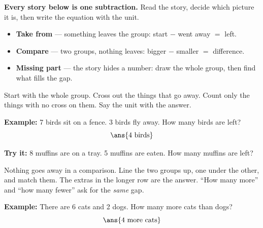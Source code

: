 \documentclass[12pt]{article}
\begin{document}

\begin{formulabox}
\textbf{Every story below is one subtraction.} Read the story, decide which
picture it is, then write the equation with the unit.
\begin{itemize}[leftmargin=0.9cm, itemsep=1pt, topsep=1pt]
\item \textbf{Take from} --- something leaves the group:
      start $-$ went away $=$ left.
\item \textbf{Compare} --- two groups, nothing leaves:
      bigger $-$ smaller $=$ difference.
\item \textbf{Missing part} --- the story hides a number:
      draw the whole group, then find what fills the gap.
\end{itemize}
\end{formulabox}


\begin{formulabox}
Start with the whole group. Cross out the things that go away. Count only the
things with no cross on them. Say the unit with the answer.
\end{formulabox}

\begin{examplebox}
\textbf{Example:} 7 birds sit on a fence. 3 birds fly away. How many birds are
left?
\[ \ans{4 \text{ birds}} \]
\end{examplebox}

\begin{tryitbox}
\textbf{Try it:} 8 muffins are on a tray. 5 muffins are eaten. How many muffins
are left?

\end{tryitbox}


\begin{formulabox}
Nothing goes away in a comparison. Line the two groups up, one under the other,
and match them. The extras in the longer row are the answer. ``How many more''
and ``how many fewer'' ask for the \emph{same} gap.
\end{formulabox}

\begin{examplebox}
\textbf{Example:} There are 6 cats and 2 dogs. How many more cats than dogs?
\[ \ans{4 \text{ more cats}} \]
\end{examplebox}
\end{document}
